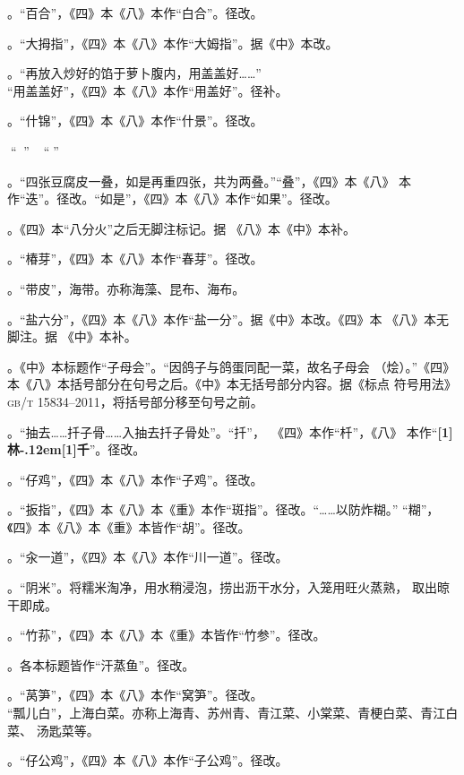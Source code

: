 。“百合”，《四》本《八》本作“白合”。径改。

。“大拇指”，《四》本《八》本作“大姆指”。据《中》本改。

。“再放入炒好的馅于萝卜腹内，用盖盖好……”\\%
“用盖盖好”，《四》本《八》本作“用盖好”。径补。

。“什锦”，《四》本《八》本作“什景”。径改。

。“𥑲水”，盐卤。“𥑲”字疑误。

。“四张豆腐皮一叠，如是再重四张，共为两叠。”“叠”，《四》本《八》
本作“迭”。径改。“如是”，《四》本《八》本作“如果”。径改。

。《四》本“八分火”之后无脚注标记{\footnotesize{}}。据
《八》本《中》本补。

。“椿芽”，《四》本《八》本作“春芽”。径改。

。“带皮”，海带。亦称海藻、昆布、海布。

。“盐六分”，《四》本《八》本作“盐一分”。据《中》本改。《四》本
《八》本无脚注{\footnotesize{}}。据
《中》本补。

。《中》本标题作“子母会”。“因鸽子与鸽蛋同配一菜，故名子母会
（烩）。”《四》本《八》本括号部分在句号之后。《中》本无括号部分内容。据《标点
符号用法》\textsc{gb/t 15834--2011}，将括号部分移至句号之前。

。“抽去……扦子骨……入抽去扦子骨处”。“扦”，~《四》本作“杄”，《八》
本作“{\bfseries\scalebox{.65}[1]{林}\kern-.12em\scalebox{.55}[1]{千}}”。径改。

。“仔鸡”，《四》本《八》本作“子鸡”。径改。

。“扳指”，《四》本《八》本《重》本作“斑指”。径改。“……以防炸糊。”
“糊”，《四》本《八》本《重》本皆作“胡”。径改。

。“汆一道”，《四》本《八》本作“川一道”。径改。

。“阴米”。将糯米淘净，用水稍浸泡，捞出沥干水分，入笼用旺火蒸熟，
取出晾干即成。

。“竹荪”，《四》本《八》本《重》本皆作“竹参”。径改。

。各本标题皆作“汗蒸鱼”。径改。

。“莴笋”，《四》本《八》本作“窝笋”。径改。\\%
“瓢儿白”，上海白菜。亦称上海青、苏州青、青江菜、小棠菜、青梗白菜、青江白菜、
汤匙菜等。

。“仔公鸡”，《四》本《八》本作“子公鸡”。径改。

\endgroup%

